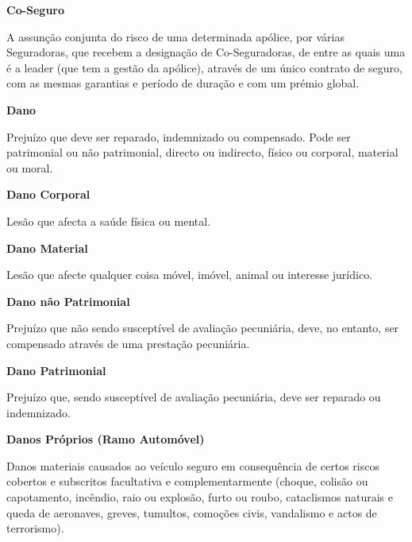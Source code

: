 \begin{description}
\item \textbf{Co-Seguro}

A assunção conjunta do risco de uma determinada apólice, por várias Seguradoras, que recebem a designação de Co-Seguradoras, de entre as quais uma é a leader (que tem a gestão da apólice), através de um único contrato de seguro, com as mesmas garantias e período de duração e com um prémio global.
\end{description}

\begin{description}
\item \textbf{Dano}

Prejuízo que deve ser reparado, indemnizado ou compensado. Pode ser patrimonial ou não patrimonial, directo ou indirecto, físico ou corporal, material ou moral.
\end{description}

\begin{description}
\item \textbf{Dano Corporal}

Lesão que afecta a saúde física ou mental.
\end{description}

\begin{description}
\item \textbf{Dano Material}

Lesão que afecte qualquer coisa móvel, imóvel, animal ou interesse jurídico.
\end{description}

\begin{description}
\item \textbf{Dano não Patrimonial}

Prejuízo que não sendo susceptível de avaliação pecuniária, deve, no entanto, ser compensado através de uma prestação pecuniária.
\end{description}

\begin{description}
\item \textbf{Dano Patrimonial}

Prejuízo que, sendo susceptível de avaliação pecuniária, deve ser reparado ou indemnizado.
\end{description}

\begin{description}
\item \textbf{Danos Próprios (Ramo Automóvel)}

Danos materiais causados ao veículo seguro em consequência de certos riscos cobertos e subscritos facultativa e complementarmente (choque, colisão ou capotamento, incêndio, raio ou explosão, furto ou roubo, cataclismos naturais e queda de aeronaves, greves, tumultos, comoções civis, vandalismo e actos de terrorismo).
\end{description}

